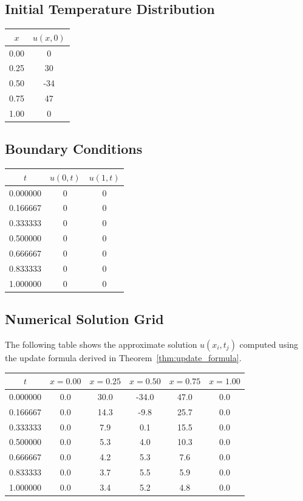 \documentclass[12pt,letterpaper,reqno]{amsart}
\theoremstyle{definition}
\numberwithin{thm}{section}
\theoremstyle{remark}
\begin{document}
\subsection{Initial Temperature Distribution}

\begin{center}
\begin{tabular}{|c|c|}
\hline
$x$ & $u(x,0)$ \\
\hline
0.00 & 0 \\
0.25 & 30 \\
0.50 & -34 \\
0.75 & 47 \\
1.00 & 0 \\
\hline
\end{tabular}
\end{center}

\subsection{Boundary Conditions}

\begin{center}
\begin{tabular}{|c|c|c|}
\hline
$t$ & $u(0,t)$ & $u(1,t)$ \\
\hline
0.000000 & 0 & 0 \\
0.166667 & 0 & 0 \\
0.333333 & 0 & 0 \\
0.500000 & 0 & 0 \\
0.666667 & 0 & 0 \\
0.833333 & 0 & 0 \\
1.000000 & 0 & 0 \\
\hline
\end{tabular}
\end{center}

\subsection{Numerical Solution Grid}

The following table shows the approximate solution $u(x_i,t_j)$ computed using the update formula derived in Theorem~\ref{thm:update_formula}.

\begin{center}
\begin{tabular}{|c|c|c|c|c|c|}
\hline
$t$ & $x=0.00$ & $x=0.25$ & $x=0.50$ & $x=0.75$ & $x=1.00$ \\
\hline
0.000000 & 0.0 & 30.0 & -34.0 & 47.0 & 0.0 \\
0.166667 & 0.0 & 14.3 & -9.8 & 25.7 & 0.0 \\
0.333333 & 0.0 & 7.9 & 0.1 & 15.5 & 0.0 \\
0.500000 & 0.0 & 5.3 & 4.0 & 10.3 & 0.0 \\
0.666667 & 0.0 & 4.2 & 5.3 & 7.6 & 0.0 \\
0.833333 & 0.0 & 3.7 & 5.5 & 5.9 & 0.0 \\
1.000000 & 0.0 & 3.4 & 5.2 & 4.8 & 0.0 \\
\hline
\end{tabular}
\end{center}
\end{document}
